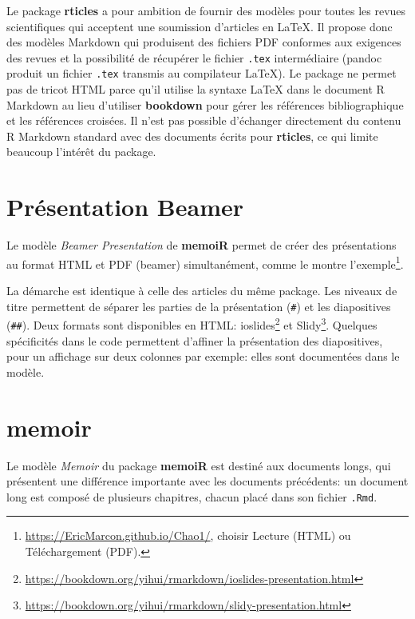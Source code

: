 \documentclass[
  12pt,
  french,
  a4paper,
  extrafontsizes,onecolumn,openright
  ]{memoir}
\begin{document}
Le package \textbf{rticles} a pour ambition de fournir des modèles pour toutes les revues scientifiques qui acceptent une soumission d'articles en LaTeX.
Il propose donc des modèles Markdown qui produisent des fichiers PDF conformes aux exigences des revues et la possibilité de récupérer le fichier \texttt{.tex} intermédiaire (pandoc produit un fichier \texttt{.tex} transmis au compilateur LaTeX).
Le package ne permet pas de tricot HTML parce qu'il utilise la syntaxe LaTeX dans le document R Markdown au lieu d'utiliser \textbf{bookdown} pour gérer les références bibliographique et les références croisées.
Il n'est pas possible d'échanger directement du contenu R Markdown standard avec des documents écrits pour \textbf{rticles}, ce qui limite beaucoup l'intérêt du package.

\hypertarget{pruxe9sentation-beamer}{%
\section{Présentation Beamer}\label{pruxe9sentation-beamer}}

Le modèle \emph{Beamer Presentation} de \textbf{memoiR} permet de créer des présentations au format HTML et PDF (beamer) simultanément, comme le montre l'exemple\footnote{\url{https://EricMarcon.github.io/Chao1/}, choisir Lecture (HTML) ou Téléchargement (PDF).}.

La démarche est identique à celle des articles du même package.
Les niveaux de titre permettent de séparer les parties de la présentation (\texttt{\#}) et les diapositives (\texttt{\#\#}).
Deux formats sont disponibles en HTML: ioslides\footnote{\url{https://bookdown.org/yihui/rmarkdown/ioslides-presentation.html}} et Slidy\footnote{\url{https://bookdown.org/yihui/rmarkdown/slidy-presentation.html}}.
Quelques spécificités dans le code permettent d'affiner la présentation des diapositives, pour un affichage sur deux colonnes par exemple: elles sont documentées dans le modèle.

\hypertarget{memoir}{%
\section{memoir}\label{memoir}}

Le modèle \emph{Memoir} du package \textbf{memoiR} est destiné aux documents longs, qui présentent une différence importante avec les documents précédents: un document long est composé de plusieurs chapitres, chacun placé dans son fichier \texttt{.Rmd}.
\end{document}
